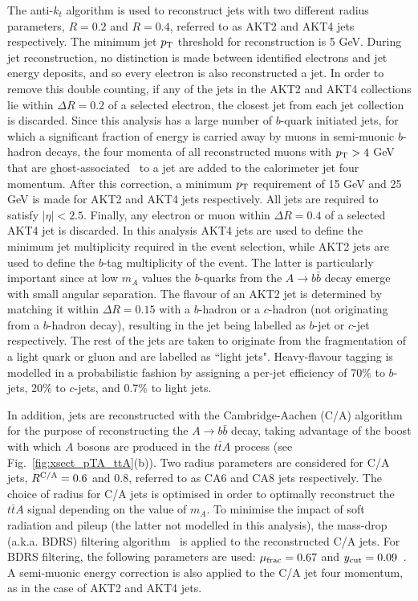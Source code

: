\documentclass[preprintnumbers,superscriptaddress,nofootinbib,aps,prd,floatfix]{revtex4}
\newcommand{\pt}{p_{\rm{T}}}
\newcommand{\ttbar}{\ensuremath{t\bar{t}}}
\begin{document}
The anti-$k_t$ algorithm is used to reconstruct jets with two different radius parameters, $R=0.2$ and $R=0.4$, referred
to as AKT2 and AKT4 jets respectively. The minimum jet $\pt$ threshold for reconstruction is 5 GeV. 
During jet reconstruction, no distinction is made between identified electrons and jet energy deposits, and
so every electron is also reconstructed a jet. In order to remove this double counting, if any of the jets in the AKT2 and AKT4 collections
lie within $\Delta R=0.2$ of a selected electron, the closest jet from each jet collection is discarded.
Since this analysis has a large number of $b$-quark initiated jets, for which a significant fraction of energy
is carried away by muons in semi-muonic $b$-hadron decays, the four momenta of all reconstructed muons 
with $\pt>4$ GeV that are ghost-associated~\cite{Cacciari:2007fd,Cacciari:2008gn} to a jet are added to the calorimeter jet four momentum.
After this correction, a minimum $\pt$ requirement of 15 GeV and 25 GeV is made
for AKT2 and AKT4 jets respectively. All jets are required to satisfy $|\eta|<2.5$. 
Finally, any electron or muon within $\Delta R=0.4$ of a selected AKT4 jet is discarded.
In this analysis AKT4 jets are used to define the minimum jet multiplicity required in the event selection, while 
AKT2 jets are used to define the $b$-tag multiplicity of the event. The latter is particularly important since 
at low $m_A$ values the $b$-quarks from the $A \to b\bar{b}$ decay emerge with small angular separation.
The flavour of an AKT2 jet is determined by matching it within $\Delta R=0.15$ with a $b$-hadron or 
a $c$-hadron (not originating from a $b$-hadron decay), resulting in the jet being labelled as $b$-jet or $c$-jet respectively. 
The rest of the jets are taken to originate from the fragmentation of a light quark or gluon and are labelled 
as ``light jets". Heavy-flavour tagging is modelled in a probabilistic fashion by assigning a per-jet efficiency of 
70\% to $b$-jets, 20\% to $c$-jets, and 0.7\% to light jets.

In addition, jets are reconstructed with the Cambridge-Aachen (C/A) algorithm~\cite{Dokshitzer:1997in,Wobisch:1998wt} 
for the purpose of reconstructing the $A \to b\bar{b}$ decay, taking advantage of the boost with which $A$ bosons are produced in the
$\ttbar A$ process (see Fig.~\ref{fig:xsect_pTA_ttA}(b)). 
Two radius parameters are considered for C/A jets, $R^{\rm C/A}=0.6$ and 0.8, referred to as CA6 and CA8 jets 
respectively. The choice of radius for C/A jets is optimised in order to optimally
reconstruct the $\ttbar A$ signal depending on the value of $m_A$. To minimise the impact of
soft radiation and pileup (the latter not modelled in this analysis), the mass-drop (a.k.a. BDRS) filtering algorithm~\cite{Butterworth:2008iy, Plehn:2009rk} 
is applied to the reconstructed C/A jets. For BDRS filtering, the following parameters are used: $\mu_{\rm frac}=0.67$ and $y_{\rm cut}=0.09$~\cite{Aad:2013gja}.
A semi-muonic energy correction is also applied to the C/A jet four momentum, as in the case of AKT2 and AKT4 jets.
\end{document}

